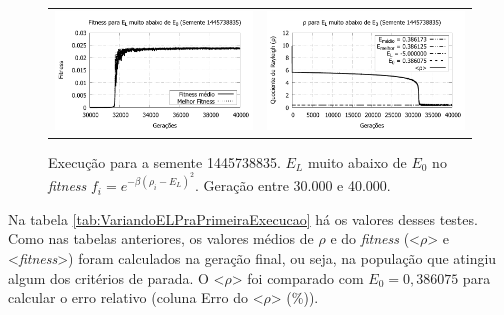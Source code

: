 	\begin{figure}[htbp]
	\centering
  \begin{tabular}{@{}cc@{}}	
		\includegraphics[width=.45\textwidth]{figs/resultados/variandoELSemente/T4_S-1445738835_fitness-extendido.pdf} &
    \includegraphics[width=.45\textwidth]{figs/resultados/variandoELSemente/T4_S-1445738835_rho_extendido.pdf}
  \end{tabular}
  \caption{Execução para a semente 1445738835. $E_L$ muito abaixo de $E_0$ no \textit{fitness} $f_i = e^{-\beta(\rho_i - E_L)^2}$. Geração entre 30.000 e 40.000.}
	\label{fig:execucoesSemente_EL_umMuitoAbaixo40000}
	\end{figure}
	
	Na tabela \ref{tab:VariandoELPraPrimeiraExecucao} há os valores desses testes. Como nas tabelas anteriores, os valores médios de $\rho$ e do \emph{fitness} (<$\rho$> e <\emph{fitness}>) foram calculados na geração final, ou seja, na população que atingiu algum dos critérios de parada. O <$\rho$> foi comparado com $E_0 = 0,386075$ para calcular o erro relativo (coluna Erro do <$\rho$> (\%)).

